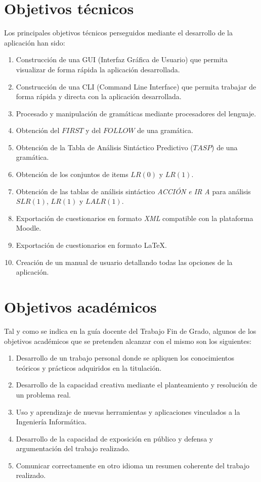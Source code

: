 
\section{Objetivos técnicos}

Los principales objetivos técnicos perseguidos mediante el desarrollo de la aplicación han sido:
\begin{enumerate}
	\item Construcción de una GUI (Interfaz Gráfica de Usuario) que permita visualizar de forma rápida la aplicación desarrollada.
	\item Construcción de una CLI (Command Line Interface) que permita trabajar de forma rápida y directa con la aplicación desarrollada.
	\item Procesado y manipulación de gramáticas mediante procesadores del lenguaje.
	\item Obtención del $FIRST$ y del $FOLLOW$ de una gramática.
	\item Obtención de la Tabla de Análisis Sintáctico Predictivo ($TASP$) de una gramática.
	\item Obtención de los conjuntos de items $LR(0)$ y  $LR(1)$.
	\item Obtención de las tablas de análisis sintáctico  \textit{ACCIÓN e IR A} para análisis $SLR(1)$, $LR(1)$ y $LALR(1)$.
	\item Exportación de cuestionarios en formato \textit{XML} compatible con la plataforma Moodle.
	
	\item Exportación de cuestionarios en formato \LaTeX{}.
	
	\item Creación de un manual de usuario detallando todas las opciones de la aplicación.
\end{enumerate}

\section{Objetivos académicos}
Tal y como se indica en la guía docente del Trabajo Fin de Grado, algunos de los objetivos académicos que se pretenden alcanzar con el mismo son los siguientes:
\begin{enumerate}
	
	\item Desarrollo de un trabajo personal donde se 	apliquen los conocimientos teóricos y prácticos adquiridos en la titulación.
	\item Desarrollo de  la capacidad creativa mediante el planteamiento y resolución de un problema real.
	
	\item Uso y aprendizaje de nuevas herramientas y aplicaciones vinculados a la Ingeniería Informática.

	\item Desarrollo de la capacidad de exposición en público y  defensa y argumentación del trabajo realizado.
	\item Comunicar correctamente en otro idioma un resumen coherente del trabajo realizado.

\end{enumerate}

